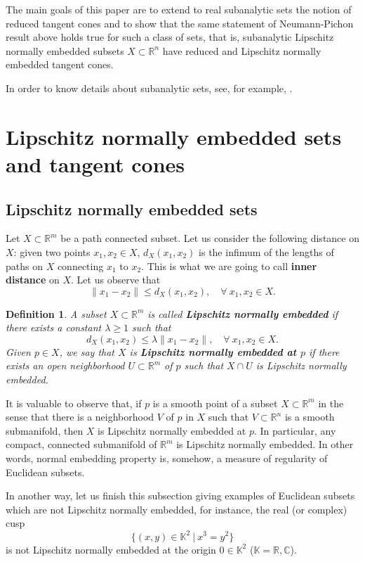 \documentclass{amsart}
\newtheorem{definition}[theorem]{Definition}
\newcommand{\R}{\mathbb{R}}
\newcommand{\C}{\mathbb{C}}
\begin{document}
The main goals of this paper are to extend to real subanalytic sets the notion of  reduced tangent cones and to show that the same statement of Neumann-Pichon result above holds true for such a class of sets, that is, subanalytic Lipschitz normally embedded subsets $X\subset\R^n$ have reduced and Lipschitz normally embedded tangent cones.

In order to know details about subanalytic sets, see, for example, \cite{BierstoneM:1988}.

\bigskip


\section{Lipschitz normally embedded sets and tangent cones}\label{section:preliminaries}
\subsection{Lipschitz normally embedded sets}

Let $X\subset\R^m$ be a path connected subset. Let us consider the following distance on $X$:  given two points $x_1,x_2\in X$, $d_X(x_1,x_2)$  is the infimum of the lengths of paths on $X$ connecting $x_1$ to $x_2$. This is what we are going to call
{\bf inner distance}  on $X$. Let us observe that
$$ \| x_1 - x_2 \| \leq d_X(x_1,x_2), \quad \forall \ x_1,x_2\in X.$$

\begin{definition}\label{definition-ne}
A subset $X\subset\R^m$ is called \emph{{\bf Lipschitz normally embedded}} if there exists a constant $\lambda\geq 1$ such that
$$d_X(x_1 , x_2) \leq  \lambda \| x_1 - x_2 \|, \quad \forall \ x_1,x_2\in X.$$
Given $p\in X$, we say that $X$ is \emph{{\bf Lipschitz normally embedded at $p$}} if there exists an open neighborhood $U\subset \R^m$ of $p$ such that $X\cap U$ is Lipschitz normally embedded.
\end{definition}

It is valuable to observe that, if $p$ is a smooth point of a subset $X\subset\R^m$ in the sense that there is a neighborhood $V$ of $p$ in $X$ such that $V\subset\R^n$ is a smooth submanifold, then $X$ is Lipschitz normally embedded at $p$. In particular, any compact, connected submanifold of $\R^m$  is Lipschitz normally embedded. In other words, normal embedding property is, somehow, a measure of regularity of Euclidean subsets.

In another way, let us finish this subsection giving examples  of  Euclidean subsets which are not Lipschitz normally embedded, for instance, the real (or complex) cusp
$$\{(x,y) \in \mathbb{K}^2 \ | \ x^3=y^2 \}$$ is not Lipschitz normally embedded at the origin $0\in\mathbb{K}^2$ ($\mathbb{K}=\R,\C$).
\end{document}
